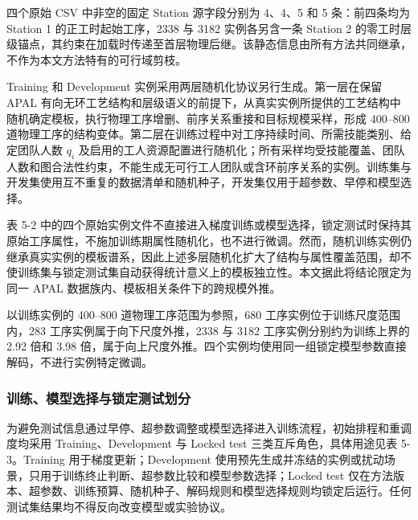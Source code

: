\documentclass[journal,10pt]{IEEEtran}
\begin{document}
四个原始 CSV 中非空的固定 Station 源字段分别为 4、4、5 和 5 条：前四条均为 Station 1 的正工时起始工序，2338 与 3182 实例各另含一条 Station 2 的零工时层级锚点，其约束在加载时传递至首层物理后继。该静态信息由所有方法共同继承，不作为本文方法特有的可行域剪枝。

Training 和 Development 实例采用两层随机化协议另行生成。第一层在保留 APAL 有向无环工艺结构和层级语义的前提下，从真实实例所提供的工艺结构中随机确定模板，执行物理工序增删、前序关系重接和目标规模采样，形成 400--800 道物理工序的结构变体。第二层在训练过程中对工序持续时间、所需技能类别、给定团队人数 \(q_i\) 及启用的工人资源配置进行随机化；所有采样均受技能覆盖、团队人数和图合法性约束，不能生成无可行工人团队或含环前序关系的实例。训练集与开发集使用互不重复的数据清单和随机种子，开发集仅用于超参数、早停和模型选择。

表 5-2 中的四个原始实例文件不直接进入梯度训练或模型选择，锁定测试时保持其原始工序属性，不施加训练期属性随机化，也不进行微调。然而，随机训练实例仍继承真实实例的模板谱系，因此上述多层随机化扩大了结构与属性覆盖范围，却不使训练集与锁定测试集自动获得统计意义上的模板独立性。本文据此将结论限定为同一 APAL 数据族内、模板相关条件下的跨规模外推。

以训练实例的 400--800 道物理工序范围为参照，680 工序实例位于训练尺度范围内，283 工序实例属于向下尺度外推，2338 与 3182 工序实例分别约为训练上界的 2.92 倍和 3.98 倍，属于向上尺度外推。四个实例均使用同一组锁定模型参数直接解码，不进行实例特定微调。

\subsubsection{训练、模型选择与锁定测试划分}\label{ux8badux7ec3ux6a21ux578bux9009ux62e9ux4e0eux9501ux5b9aux6d4bux8bd5ux5212ux5206}

为避免测试信息通过早停、超参数调整或模型选择进入训练流程，初始排程和重调度均采用 Training、Development 与 Locked test 三类互斥角色，具体用途见表 5-3。Training 用于梯度更新；Development 使用预先生成并冻结的实例或扰动场景，只用于训练终止判断、超参数比较和模型参数选择；Locked test 仅在方法版本、超参数、训练预算、随机种子、解码规则和模型选择规则均锁定后运行。任何测试集结果均不得反向改变模型或实验协议。
\end{document}
